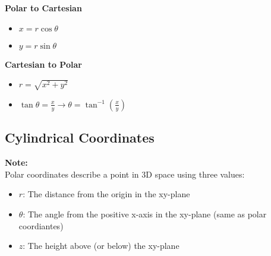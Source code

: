 \documentclass[10pt]{article}                               %
\begin{document}
\begin{tcolorbox}
\begin{adjustwidth}{2em}{0pt}
\begin{adjustwidth}{2em}{0pt}
\begin{tcolorbox}[enhanced, colback=white, colframe=black, boxrule=0.5pt]
            \end{tcolorbox}


            \vspace{0.5em}

            \textbf{Polar to Cartesian}

            \begin{itemize}
                \item \( x = r\cos\theta \)
                \item \( y = r\sin\theta \)
            \end{itemize}

            \vspace{0.5em}

            \textbf{Cartesian to Polar}

            \begin{itemize}
                \item \( r = \sqrt{x^2 + y^2} \)
                \item \( \tan\theta = \frac{x}{y}  \rightarrow  \theta = \tan^{-1}\left(\frac{x}{y}\right) \)
            \end{itemize}

        \end{adjustwidth}


        \subsection*{Cylindrical Coordinates}

        \begin{adjustwidth}{2em}{0pt}

            \begin{tcolorbox}[enhanced, colback=white, colframe=black, boxrule=0.5pt]

                \textbf{Note:} \\
                Polar coordinates describe a point in 3D space using three values:

                \begin{itemize}
                    \item \( r \): The distance from the origin in the xy-plane
                    \item \( \theta \): The angle from the positive x-axis in the xy-plane (same as polar coordiantes)
                    \item \( z \): The height above (or below) the xy-plane
                \end{itemize}


\end{tcolorbox}
\end{adjustwidth}
\end{adjustwidth}
\end{tcolorbox}
\end{document}
